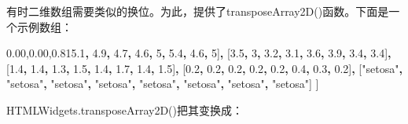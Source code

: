 \documentclass[]{book}
\newenvironment{Shaded}{\begin{snugshade}}{\end{snugshade}}
\newcommand{\DecValTok}[1]{\textcolor[rgb]{0.00,0.00,0.81}{#1}}
\newcommand{\FloatTok}[1]{\textcolor[rgb]{0.00,0.00,0.81}{#1}}
\newcommand{\StringTok}[1]{\textcolor[rgb]{0.31,0.60,0.02}{#1}}
\newcommand{\OperatorTok}[1]{\textcolor[rgb]{0.81,0.36,0.00}{\textbf{#1}}}
\newcommand{\NormalTok}[1]{#1}
\theoremstyle{definition}
\theoremstyle{definition}
\theoremstyle{definition}
\theoremstyle{remark}
\begin{document}
有时二维数组需要类似的换位。为此，提供了transposeArray2D()函数。下面是一个示例数组：

\begin{Shaded}
\begin{Highlighting}[]
\NormalTok{[}
\NormalTok{  [}\FloatTok{5.1}\OperatorTok{,} \FloatTok{4.9}\OperatorTok{,} \FloatTok{4.7}\OperatorTok{,} \FloatTok{4.6}\OperatorTok{,} \DecValTok{5}\OperatorTok{,} \FloatTok{5.4}\OperatorTok{,} \FloatTok{4.6}\OperatorTok{,} \DecValTok{5}\NormalTok{]}\OperatorTok{,}
\NormalTok{  [}\FloatTok{3.5}\OperatorTok{,} \DecValTok{3}\OperatorTok{,} \FloatTok{3.2}\OperatorTok{,} \FloatTok{3.1}\OperatorTok{,} \FloatTok{3.6}\OperatorTok{,} \FloatTok{3.9}\OperatorTok{,} \FloatTok{3.4}\OperatorTok{,} \FloatTok{3.4}\NormalTok{]}\OperatorTok{,}
\NormalTok{  [}\FloatTok{1.4}\OperatorTok{,} \FloatTok{1.4}\OperatorTok{,} \FloatTok{1.3}\OperatorTok{,} \FloatTok{1.5}\OperatorTok{,} \FloatTok{1.4}\OperatorTok{,} \FloatTok{1.7}\OperatorTok{,} \FloatTok{1.4}\OperatorTok{,} \FloatTok{1.5}\NormalTok{]}\OperatorTok{,}
\NormalTok{  [}\FloatTok{0.2}\OperatorTok{,} \FloatTok{0.2}\OperatorTok{,} \FloatTok{0.2}\OperatorTok{,} \FloatTok{0.2}\OperatorTok{,} \FloatTok{0.2}\OperatorTok{,} \FloatTok{0.4}\OperatorTok{,} \FloatTok{0.3}\OperatorTok{,} \FloatTok{0.2}\NormalTok{]}\OperatorTok{,}
\NormalTok{  [}\StringTok{"setosa"}\OperatorTok{,} \StringTok{"setosa"}\OperatorTok{,} \StringTok{"setosa"}\OperatorTok{,} \StringTok{"setosa"}\OperatorTok{,} \StringTok{"setosa"}\OperatorTok{,} \StringTok{"setosa"}\OperatorTok{,} \StringTok{"setosa"}\OperatorTok{,} \StringTok{"setosa"}\NormalTok{]}
\NormalTok{] }
\end{Highlighting}
\end{Shaded}

HTMLWidgets.transposeArray2D()把其变换成：
\end{document}
